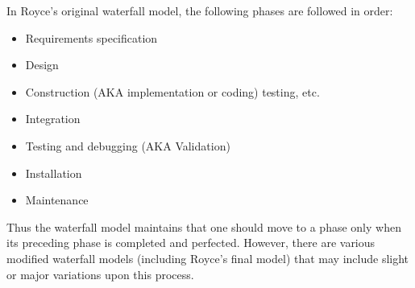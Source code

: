 	In Royce's original waterfall model, the following phases are followed in order:
	
	\begin{itemize}
		\item Requirements specification
		\item Design
		\item Construction (AKA implementation or coding) testing, etc.
		\item Integration
		\item Testing and debugging (AKA Validation)
		\item Installation
		\item Maintenance
	\end{itemize}
	
	Thus the waterfall model maintains that one should move to a phase only when its preceding phase is completed and perfected. However, there are various modified waterfall models (including Royce's final model) that may include slight or major variations upon this process.
